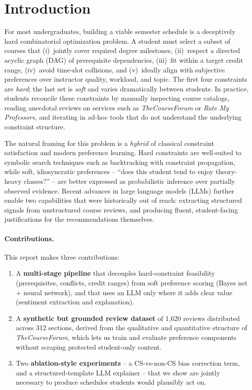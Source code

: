 \documentclass[10pt,letterpaper]{article}
\begin{document}
\section{Introduction}

For most undergraduates, building a viable semester schedule is a deceptively
hard combinatorial optimization problem. A student must select a subset of
courses that (i)~jointly cover required degree milestones, (ii)~respect a
directed acyclic graph (DAG) of prerequisite dependencies, (iii)~fit within a
target credit range, (iv)~avoid time-slot collisions, and (v)~ideally align
with subjective preferences over instructor quality, workload, and topic.
The first four constraints are \emph{hard}; the last set is \emph{soft} and
varies dramatically between students. In practice, students reconcile these
constraints by manually inspecting course catalogs, reading anecdotal reviews
on services such as \emph{TheCourseForum} or \emph{Rate My Professors}, and
iterating in ad-hoc tools that do not understand the underlying constraint
structure.

The natural framing for this problem is a \emph{hybrid} of classical
constraint satisfaction and modern preference learning. Hard constraints are
well-suited to symbolic search techniques such as backtracking with
constraint propagation, while soft, idiosyncratic preferences -- ``does this
student tend to enjoy theory-heavy classes?'' -- are better expressed as
probabilistic inference over partially observed evidence. Recent advances in
large language models (LLMs) further enable two capabilities that were
historically out of reach: extracting structured signals from unstructured
course reviews, and producing fluent, student-facing justifications for the
recommendations themselves.

\paragraph{Contributions.} This report makes three contributions:
\begin{enumerate}[leftmargin=*,topsep=2pt,itemsep=1pt]
  \item A \textbf{multi-stage pipeline} that decouples hard-constraint
    feasibility (prerequisites, conflicts, credit ranges) from soft preference
    scoring (Bayes net + neural network), and that uses an LLM only where it
    adds clear value (sentiment extraction and explanation).
  \item A \textbf{synthetic but grounded review dataset} of 1{,}620 reviews
    distributed across 312 sections, derived from the qualitative and
    quantitative structure of \emph{TheCourseForum}, which lets us train and
    evaluate preference components without scraping protected student-only
    content.
  \item Two \textbf{ablation-style experiments} -- a CS-vs-non-CS bias
    correction term, and a structured-template LLM explainer -- that we show
    are jointly necessary to produce schedules students would plausibly act
    on.
\end{enumerate}
\end{document}
